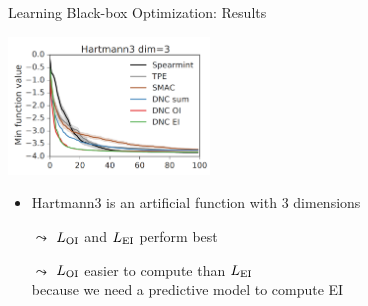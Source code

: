 \begin{frame}[c]{Learning Black-box Optimization: Results }

\centering
\includegraphics[width=0.4\textwidth]{images/l2bo_hartmann3}

\begin{itemize}
\item Hartmann3 is an artificial function with 3 dimensions
\pause
\item[$\leadsto$] $L_{\text{OI}}$ and $L_{\text{EI}}$ perform best
\item[$\leadsto$] $L_{\text{OI}}$ easier to compute than $L_{\text{EI}}$\\ because we need a predictive model to compute EI 
\end{itemize}

\end{frame}



